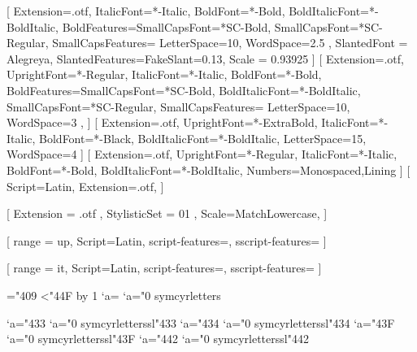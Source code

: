 
% 
%

\setmainfont{Alegreya}[
  Extension=.otf,
  ItalicFont=*-Italic,
  BoldFont=*-Bold,
  BoldItalicFont=*-BoldItalic,
  BoldFeatures={SmallCapsFont=*SC-Bold},
  SmallCapsFont=*SC-Regular,
  SmallCapsFeatures={%
    LetterSpace=10,
    WordSpace=2.5
  },
  SlantedFont = Alegreya,
  SlantedFeatures={FakeSlant=0.13},
  Scale = 0.93925
]
\setsansfont{AlegreyaSans}[
  Extension=.otf,
  UprightFont=*-Regular,
  ItalicFont=*-Italic,
  BoldFont=*-Bold,
  BoldFeatures={SmallCapsFont=*SC-Bold},
  BoldItalicFont=*-BoldItalic,
  SmallCapsFont=*SC-Regular,
  SmallCapsFeatures={%
    LetterSpace=10,
    WordSpace=3
  },
]
[
  Extension=.otf,
  UprightFont=*-ExtraBold,
  ItalicFont=*-Italic,
  BoldFont=*-Black,
  BoldItalicFont=*-BoldItalic,
  LetterSpace=15,
  WordSpace=4
]
[
  Extension=.otf,
  UprightFont=*-Regular,
  ItalicFont=*-Italic,
  BoldFont=*-Bold,
  BoldItalicFont=*-BoldItalic,
  Numbers={Monospaced,Lining}
]
[
  Script=Latin,
  Extension=.otf,
]

% 
%

\usepackage{unicode-math}

[%
  Extension = .otf ,
  StylisticSet = 01 ,
  Scale=MatchLowercase,
]

[%
  range = {up},
  Script=Latin,
  script-features={},
  sscript-features={}
]

[%
  range = {it},
  Script=Latin,
  script-features={},
  sscript-features={}
]

\newcommand{\makecyrmathletter}[1]{%
  \begingroup\lccode`a=#1\lowercase{\endgroup
  \Umathcode`a}="0 \csname symcyrletters\endcsname\space #1
}
="409
\loop\ifnum{}<"44F
  \advance{} by 1
  \makecyrmathletter{\count255}
\repeat


\newcommand{\makecyrmathlettersl}[1]{%
  \begingroup\lccode`a=#1\lowercase{\endgroup
  \Umathcode`a}="0 \csname symcyrletterssl\endcsname\space #1
}
\makecyrmathlettersl{"433} %
\makecyrmathlettersl{"434} %
\makecyrmathlettersl{"43F} %
\makecyrmathlettersl{"442} %
